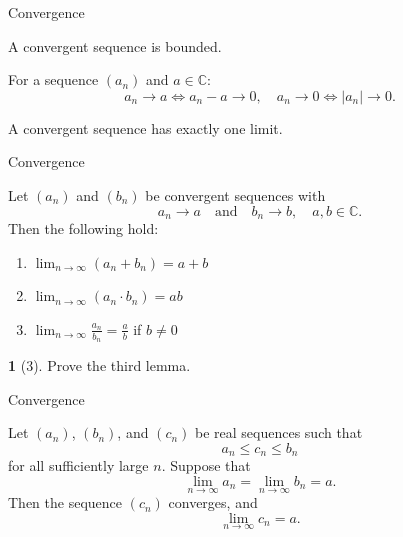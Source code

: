 \documentclass[dvipsnames]{beamer}
\theoremstyle{plain}
\theoremstyle{definition}
\newtheorem{exercise}[theorem]{\translate{Exercise}}
\begin{document}
\begin{frame}{Convergence}

\begin{lemma}
A convergent sequence is bounded.
\end{lemma}

\begin{lemma}
For a sequence \((a_n)\) and \(a \in \mathbb{C}\):
\[
a_n \to a \iff a_n - a \to 0, \quad 
a_n \to 0 \iff |a_n| \to 0.
\]
\end{lemma}

\begin{lemma}
A convergent sequence has exactly one limit.
\end{lemma}

\end{frame}

\begin{frame}{Convergence}

\begin{definition}
Let \((a_n)\) and \((b_n)\) be convergent sequences with  
\[
a_n \to a \quad \text{and} \quad b_n \to b, \quad a,b \in \mathbb{C}.
\]  
Then the following hold:

\begin{enumerate}
    \item \(\displaystyle \lim_{n \to \infty} (a_n + b_n) = a + b\)
    \item \(\displaystyle \lim_{n \to \infty} (a_n \cdot b_n) = a b\)
    \item \(\displaystyle \lim_{n \to \infty} \frac{a_n}{b_n} = \frac{a}{b} \) if \(b \neq 0\)
\end{enumerate}
\end{definition}
\begin{exercise}[3]
  Prove the third lemma.
\end{exercise}

\end{frame}

\begin{frame}{Convergence}

\begin{theorem}
Let \((a_n)\), \((b_n)\), and \((c_n)\) be real sequences such that
\[
a_n \le c_n \le b_n
\]
for all sufficiently large \(n\). Suppose that
\[
\lim_{n \to \infty} a_n = \lim_{n \to \infty} b_n = a.
\]
Then the sequence \((c_n)\) converges, and
\[
\lim_{n \to \infty} c_n = a.
\]
\end{theorem}

\end{frame}
\end{document}
